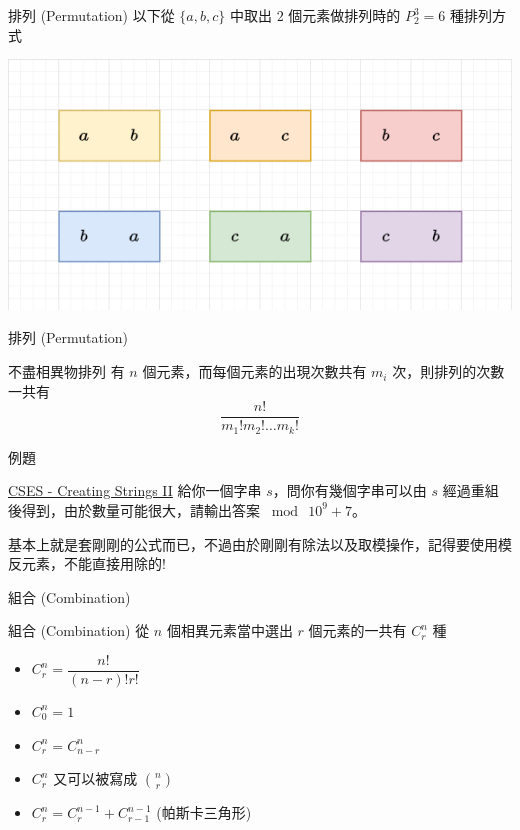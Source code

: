 \documentclass[aspectratio=169]{beamer}
\begin{document}
    \begin{frame}{排列 (Permutation)}
        以下從 $\{a,b,c\}$ 中取出 $2$ 個元素做排列時的 $P^3_2 = 6$ 種排列方式
        \begin{center}
            \includegraphics[scale=0.75]{images/nPr.png}
        \end{center}
    \end{frame}
    
    \begin{frame}{排列 (Permutation)}
        \begin{alertblock}{不盡相異物排列}
            有 $n$ 個元素，而每個元素的出現次數共有 $m_i$ 次，則排列的次數一共有
            $$\dfrac{n!}{m_1!m_2!\dots m_k!}$$
        \end{alertblock}
    \end{frame}
    
    \begin{frame}{例題}
        \begin{block}{\href{https://cses.fi/problemset/task/1715}{CSES - Creating Strings II}}
            給你一個字串 $s$，問你有幾個字串可以由 $s$ 經過重組後得到，由於數量可能很大，請輸出答案 $\bmod \ 10^9+7$。
        \end{block} \pause
        基本上就是套剛剛的公式而已，不過由於剛剛有除法以及取模操作，記得要使用模反元素，不能直接用除的!
    \end{frame}
    
    \begin{frame}{組合 (Combination)}
        \begin{alertblock}{組合 (Combination)}
            從 $n$ 個相異元素當中選出 $r$ 個元素的一共有 $C^n_r$ 種
            \begin{itemize}
                \item $C^n_r = \dfrac{n!}{(n-r)!r!}$
                \item $C^n_0 = 1$
                \item $C^n_r = C^n_{n-r}$
                \item $C^n_r$ 又可以被寫成 $\binom{n}{r}$
                \item $C^n_r = C^{n-1}_r + C^{n-1}_{r-1}$ (帕斯卡三角形)
            \end{itemize}
        \end{alertblock}
    \end{frame}
    
\end{document}
